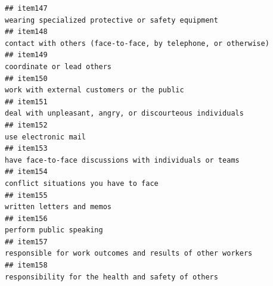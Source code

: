 \documentclass[
  man]{apa6}
\begin{document}
\begin{verbatim}
## item147                                                                                                                                                                        wearing specialized protective or safety equipment
## item148                                                                                                                                                           contact with others (face-to-face, by telephone, or otherwise) 
## item149                                                                                                                                                                                                 coordinate or lead others
## item150                                                                                                                                                                                work with external customers or the public
## item151                                                                                                                                                                  deal with unpleasant, angry, or discourteous individuals
## item152                                                                                                                                                                                                       use electronic mail
## item153                                                                                                                                                                   have face-to-face discussions with individuals or teams
## item154                                                                                                                                                                                      conflict situations you have to face
## item155                                                                                                                                                                                                 written letters and memos
## item156                                                                                                                                                                                                   perform public speaking
## item157                                                                                                                                                                responsible for work outcomes and results of other workers
## item158                                                                                                                                                                        responsibility for the health and safety of others

\end{verbatim}
\end{document}
